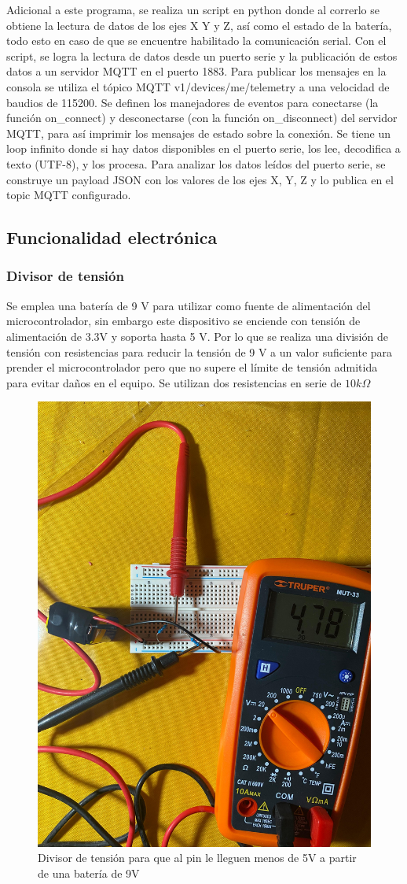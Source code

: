 Adicional a este programa, se realiza un script en python donde al correrlo se obtiene la lectura de datos de los ejes X Y y Z, así como el estado de la batería, todo esto en caso de que se encuentre habilitado la comunicación serial. Con el script, se logra la lectura de datos desde un puerto serie y la publicación de estos datos a un servidor MQTT en el puerto 1883. Para publicar los mensajes en la consola se utiliza el tópico MQTT v1/devices/me/telemetry a una velocidad de baudios de 115200. Se definen los manejadores de eventos para conectarse (la función on\_connect) y desconectarse (con la función on\_disconnect) del servidor MQTT, para así imprimir los mensajes de estado sobre la conexión. Se tiene un loop infinito donde si hay datos disponibles en el puerto serie, los lee, decodifica a texto (UTF-8), y los procesa. Para analizar los datos leídos del puerto serie, se construye un payload JSON con los valores de los ejes X, Y, Z y lo publica en el topic MQTT configurado. 


\subsection{Funcionalidad electrónica}

\subsubsection{Divisor de tensión}

Se emplea una batería de 9 V para utilizar como fuente de alimentación del microcontrolador, sin embargo este dispositivo se enciende con tensión de alimentación de 3.3V y soporta hasta 5 V. Por lo que se realiza una división de tensión con resistencias para reducir la tensión de 9 V a un valor suficiente para prender el microcontrolador pero que no supere el límite de tensión admitida para evitar daños en el equipo. Se utilizan dos resistencias en serie de $10k\Omega$

\begin{figure}[H]
        \centering
        \includegraphics[width=0.5\linewidth]{fotos/voltaje.jpeg}
        \caption{Divisor de tensión para que al pin le lleguen menos de 5V a partir de una batería de 9V}
        \label{voltaje}
    \end{figure}
    
